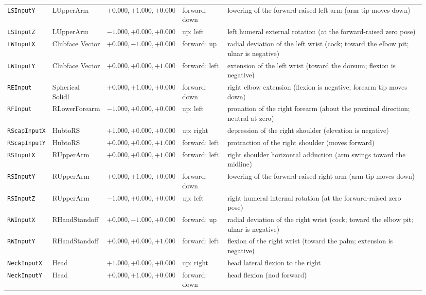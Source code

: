 \documentclass[11pt,a4paper]{article}
\begin{document}
{\begin{longtable}{@{}l l l l p{50mm}@{}}
\texttt{LSInputY} & LUpperArm & $+0.000, +1.000, +0.000$ & forward: down & lowering of the forward-raised left arm (arm tip moves down) \\
\texttt{LSInputZ} & LUpperArm & $-1.000, +0.000, +0.000$ & up: left & left humeral external rotation (at the forward-raised zero pose) \\
\texttt{LWInputX} & Clubface Vector & $+0.000, -1.000, +0.000$ & forward: up & radial deviation of the left wrist (cock; toward the elbow pit; ulnar is negative) \\
\texttt{LWInputY} & Clubface Vector & $+0.000, +0.000, +1.000$ & forward: left & extension of the left wrist (toward the dorsum; flexion is negative) \\
\texttt{REInput} & Spherical Solid1 & $+0.000, +1.000, +0.000$ & forward: down & right elbow extension (flexion is negative; forearm tip moves down) \\
\texttt{RFInput} & RLowerForearm & $-1.000, +0.000, +0.000$ & up: left & pronation of the right forearm (about the proximal direction; neutral at zero) \\
\texttt{RScapInputX} & HubtoRS & $+1.000, +0.000, +0.000$ & up: right & depression of the right shoulder (elevation is negative) \\
\texttt{RScapInputY} & HubtoRS & $+0.000, +0.000, +1.000$ & forward: left & protraction of the right shoulder (moves forward) \\
\texttt{RSInputX} & RUpperArm & $+0.000, +0.000, +1.000$ & forward: left & right shoulder horizontal adduction (arm swings toward the midline) \\
\texttt{RSInputY} & RUpperArm & $+0.000, +1.000, +0.000$ & forward: down & lowering of the forward-raised right arm (arm tip moves down) \\
\texttt{RSInputZ} & RUpperArm & $-1.000, +0.000, +0.000$ & up: left & right humeral internal rotation (at the forward-raised zero pose) \\
\texttt{RWInputX} & RHandStandoff & $+0.000, -1.000, +0.000$ & forward: up & radial deviation of the right wrist (cock; toward the elbow pit; ulnar is negative) \\
\texttt{RWInputY} & RHandStandoff & $+0.000, +0.000, +1.000$ & forward: left & flexion of the right wrist (toward the palm; extension is negative) \\
\texttt{NeckInputX} & Head & $+1.000, +0.000, +0.000$ & up: right & head lateral flexion to the right \\
\texttt{NeckInputY} & Head & $+0.000, +1.000, +0.000$ & forward: down & head flexion (nod forward) \\

\end{longtable}}
\end{document}
